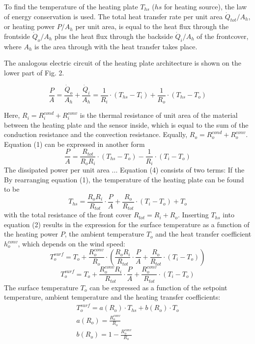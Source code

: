 To find the temperature of the heating plate $T_{hs}$ ($hs$ for heating source), the law of energy conservation is used. The total heat transfer rate per unit area \(\dot Q_{tot}/A_h\), or heating power \(P/A_h\) per unit area, is equal to the heat flux through the frontside \(\dot Q_o/A_h\) plus the heat flux through the backside \(\dot Q_i/A_h\) of the frontcover, where $A_h$ is the area through with the heat transfer takes place. 

The analogous electric circuit of the heating plate architecture is shown on the lower part of Fig. 2. 

\begin{equation}
\frac{P}{A} = \frac{\dot Q_o}{A_h} + \frac{\dot Q_i}{A_h} = \frac{1}{R_{i}}\cdot (T_{hs} - T_{i}) + \frac{1}{R_o}\cdot (T_{hs} - T_{o})
\end{equation}

Here, $R_i = R_i^{cond} + R_i^{conv}$ is the thermal resistance of unit area of the material between the heating plate and the sensor inside, which is equal to the sum of the conduction resistance and the convection resistance. Equally, $R_o = R_o^{cond} + R_o^{conv}$. Equation (1) can be expressed in another form
\begin{equation}
\frac{P}{A} = \frac{R_{tot}}{R_{o} R_{i}}\cdot(T_{hs}-T_{o}) - \frac{1}{R_{i}}\cdot(T_{i}-T_{o})
\end{equation}
The dissipated power per unit area ... Equation (4) consists of two terms: If the 
By rearranging equation (1), the temperature of the heating plate can be found to be 
\begin{equation}
T_{hs} = \frac{R_{o} R_{i}}{R_{tot}}\cdot\frac{P}{A} + \frac{R_{o}}{R_{tot}}\cdot(T_{i}-T_{o}) + T_{o} 
\end{equation}
with the total resistance of the front cover $R_{tot} = R_i + R_o$. Inserting $T_{hs}$ into equation (2) results in the expression for the surface temperature as a function of the heating power $P$, the ambient temperature $T_o$ and the heat transfer coefficient $h_o^{conv}$, which depends on the wind speed:
\begin{equation}
T_o^{surf} = T_o + \frac{R_o^{conv}}{R_o}\cdot(\frac{R_{o} R_{i}}{R_{tot}}\cdot\frac{P}{A} + \frac{R_{o}}{R_{tot}}\cdot(T_{i}-T_{o}))
\end{equation}
\begin{equation}
T_o^{surf} = T_o + \frac{R_o^{conv} R_{i}}{R_{tot}}\cdot\frac{P}{A} + \frac{R_o^{conv}}{R_{tot}}\cdot(T_{i}-T_{o})
\end{equation}
The surface temperature $T_o$ can be expressed as a function of the setpoint temperature, ambient temperature and the heating transfer coefficients:
\begin{eqnarray}
T_o^{surf} = a(R_o)\cdot T_{hs} + b(R_o)\cdot T_o \\
a(R_o) = \frac{R_o^{conv}}{R_o} \\
b(R_o) = 1-\frac{R_o^{conv}}{R_o}
\end{eqnarray}


